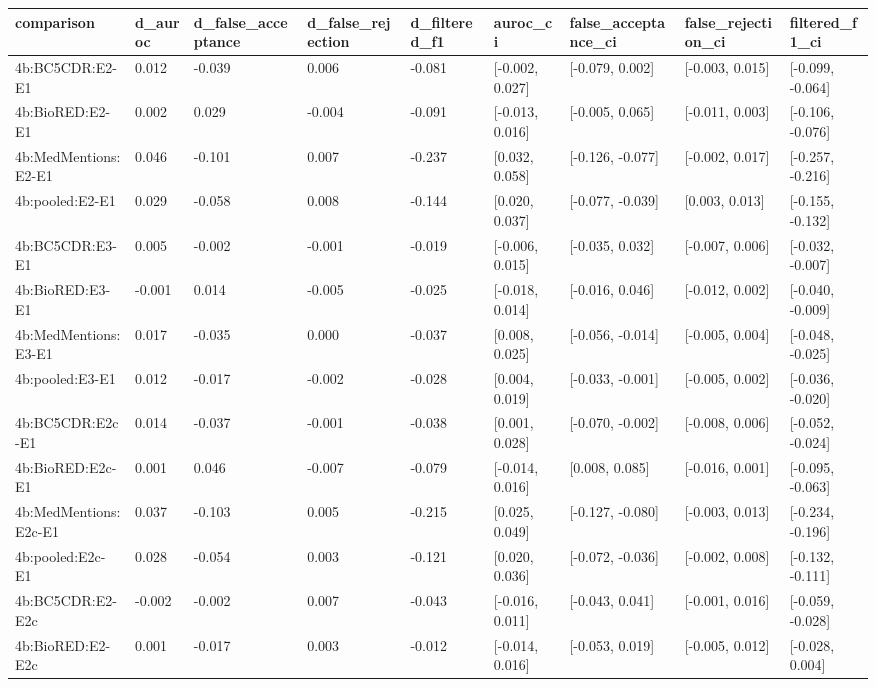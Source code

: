 \begin{table}[t]
\centering
\small
\begin{tabular}{lllllllll}
\hline
comparison & d\_auroc & d\_false\_acceptance & d\_false\_rejection & d\_filtered\_f1 & auroc\_ci & false\_acceptance\_ci & false\_rejection\_ci & filtered\_f1\_ci \\
\hline
4b:BC5CDR:E2-E1 & 0.012 & -0.039 & 0.006 & -0.081 & [-0.002, 0.027] & [-0.079, 0.002] & [-0.003, 0.015] & [-0.099, -0.064] \\
4b:BioRED:E2-E1 & 0.002 & 0.029 & -0.004 & -0.091 & [-0.013, 0.016] & [-0.005, 0.065] & [-0.011, 0.003] & [-0.106, -0.076] \\
4b:MedMentions:E2-E1 & 0.046 & -0.101 & 0.007 & -0.237 & [0.032, 0.058] & [-0.126, -0.077] & [-0.002, 0.017] & [-0.257, -0.216] \\
4b:pooled:E2-E1 & 0.029 & -0.058 & 0.008 & -0.144 & [0.020, 0.037] & [-0.077, -0.039] & [0.003, 0.013] & [-0.155, -0.132] \\
4b:BC5CDR:E3-E1 & 0.005 & -0.002 & -0.001 & -0.019 & [-0.006, 0.015] & [-0.035, 0.032] & [-0.007, 0.006] & [-0.032, -0.007] \\
4b:BioRED:E3-E1 & -0.001 & 0.014 & -0.005 & -0.025 & [-0.018, 0.014] & [-0.016, 0.046] & [-0.012, 0.002] & [-0.040, -0.009] \\
4b:MedMentions:E3-E1 & 0.017 & -0.035 & 0.000 & -0.037 & [0.008, 0.025] & [-0.056, -0.014] & [-0.005, 0.004] & [-0.048, -0.025] \\
4b:pooled:E3-E1 & 0.012 & -0.017 & -0.002 & -0.028 & [0.004, 0.019] & [-0.033, -0.001] & [-0.005, 0.002] & [-0.036, -0.020] \\
4b:BC5CDR:E2c-E1 & 0.014 & -0.037 & -0.001 & -0.038 & [0.001, 0.028] & [-0.070, -0.002] & [-0.008, 0.006] & [-0.052, -0.024] \\
4b:BioRED:E2c-E1 & 0.001 & 0.046 & -0.007 & -0.079 & [-0.014, 0.016] & [0.008, 0.085] & [-0.016, 0.001] & [-0.095, -0.063] \\
4b:MedMentions:E2c-E1 & 0.037 & -0.103 & 0.005 & -0.215 & [0.025, 0.049] & [-0.127, -0.080] & [-0.003, 0.013] & [-0.234, -0.196] \\
4b:pooled:E2c-E1 & 0.028 & -0.054 & 0.003 & -0.121 & [0.020, 0.036] & [-0.072, -0.036] & [-0.002, 0.008] & [-0.132, -0.111] \\
4b:BC5CDR:E2-E2c & -0.002 & -0.002 & 0.007 & -0.043 & [-0.016, 0.011] & [-0.043, 0.041] & [-0.001, 0.016] & [-0.059, -0.028] \\
4b:BioRED:E2-E2c & 0.001 & -0.017 & 0.003 & -0.012 & [-0.014, 0.016] & [-0.053, 0.019] & [-0.005, 0.012] & [-0.028, 0.004] \\

\end{tabular}
\end{table}
